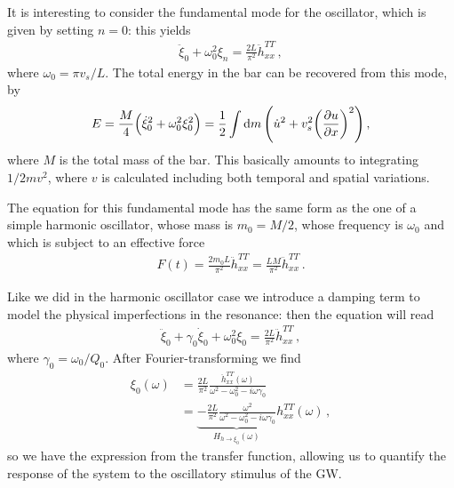 \documentclass[main.tex]{subfiles}
\begin{document}

It is interesting to consider the fundamental mode for the oscillator, which is given by setting \(n =0\): this yields 
%
\begin{align}
\ddot{\xi}_{0} + \omega_0^2 \xi_{n} = \frac{2L}{\pi^2} \ddot{h}^{TT}_{xx}
\,,
\end{align}
%
where \(\omega_0 = \pi v_s /L\). 
The total energy in the bar can be recovered from this mode, by 
%
\begin{align}
E = \frac{M}{4} \qty(\dot{\xi}_{0}^2 + \omega_0^2 \xi_0^2 )
= \frac{1}{2} \int \dd{m} \qty(\dot{u}^2 + v_s^2 \qty(\pdv{u}{x})^2)
\,,
\end{align}
%
where \(M\) is the total mass of the bar. This basically amounts to integrating \(1/2 m v^2\), where \(v\) is calculated including both temporal and spatial variations. 

The equation for this fundamental mode has the same form as the one of a simple harmonic oscillator, whose mass is \(m_0 = M/2\), whose frequency is \(\omega_0 \) and which is subject to an effective force 
%
\begin{align} \label{eq:effective-force-harmonic-oscillator-bar-fundamental}
F(t) = \frac{2  m_0  L}{\pi^2} \ddot{h}_{xx}^{TT} = \frac{LM}{\pi^2}
\ddot{h}^{TT}_{xx}
\,.
\end{align}

Like we did in the harmonic oscillator case we introduce a damping term to model the physical imperfections in the resonance: then the equation will read 
%
\begin{align} \label{eq:damped-zeroth-mode-resonant-bar}
\ddot{\xi}_{0} + \gamma_0 \dot{\xi}_{0} + \omega_0^2 \xi_0 = \frac{2L}{\pi^2} \ddot{h}^{TT}_{xx}
\,,
\end{align}
%
where \(\gamma_0 = \omega_0 / Q_0 \). 
After Fourier-transforming we find 
%
\begin{align} \label{eq:transfer-function-resonant-bar-fundamental}
\xi_0 (\omega ) 
&= \frac{2L}{\pi^2} \frac{\ddot{h}_{xx}^{TT} (\omega )}{\omega^2- \omega_0 ^2 - i \omega \gamma_0 }  \\
&= \underbrace{-\frac{2L}{\pi^2} \frac{\omega^2}{\omega^2- \omega_0 ^2 - i \omega \gamma_0 }}_{H_{h \to \xi_0 } (\omega )}  h_{xx}^{TT} (\omega )
\,,
\end{align}
%
so we have the expression from the transfer function, allowing us to quantify the response of the system to the oscillatory stimulus of the GW. 
\end{document}
